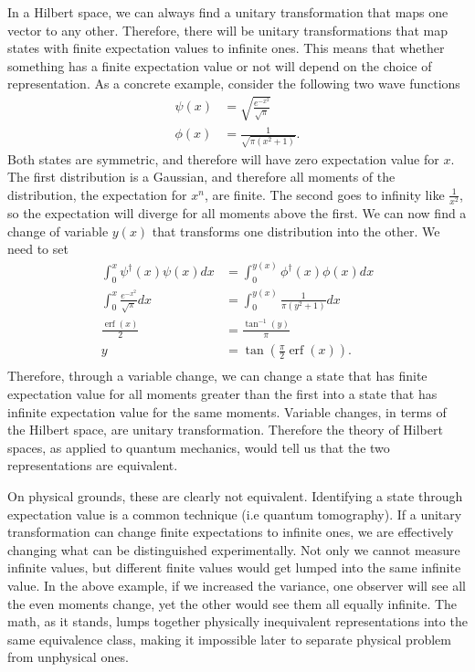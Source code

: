 \documentclass[10pt,twocolumn, nofootinbib]{revtex4-2}
\DeclareMathOperator{\erf}{erf}
\begin{document}
In a Hilbert space, we can always find a unitary transformation that maps one vector to any other. Therefore, there will be unitary transformations that map states with finite expectation values to infinite ones. This means that whether something has a finite expectation value or not will depend on the choice of representation. As a concrete example, consider the following two wave functions
\begin{align}
	\psi(x) &= \sqrt{\frac{e^{-x^2}}{\sqrt{\pi}}} \\
	\phi(x) &= \frac{1}{\sqrt{\pi(x^2 + 1)}}.
\end{align}
Both states are symmetric, and therefore will have zero expectation value for $x$. The first distribution is a Gaussian, and therefore all moments of the distribution, the expectation for $x^n$, are finite. The second goes to infinity like $\frac{1}{x^2}$, so the expectation will diverge for all moments above the first. We can now find a change of variable $y(x)$ that transforms one distribution into the other. We need to set
\begin{equation}
	\begin{aligned}
	\int_{0}^{x} \psi^\dagger(x) \psi(x) dx &= \int_{0}^{y(x)} \phi^\dagger(x) \phi(x) dx \\
	\int_{0}^{x} \frac{e^{-x^2}}{\sqrt{\pi}} dx &= \int_{0}^{y(x)} \frac{1}{\pi(y^2 + 1)} dx \\
	\frac{\erf(x)}{2} &= \frac{\tan^{-1}(y)}{\pi} \\
	y &= \tan \left(\frac{\pi}{2}\erf(x)\right). \\
	\end{aligned}
\end{equation}
Therefore, through a variable change, we can change a state that has finite expectation value for all moments greater than the first into a state that has infinite expectation value for the same moments. Variable changes, in terms of the Hilbert space, are unitary transformation. Therefore the theory of Hilbert spaces, as applied to quantum mechanics, would tell us that the two representations are equivalent.

On physical grounds, these are clearly not equivalent. Identifying a state through expectation value is a common technique (i.e quantum tomography). If a unitary transformation can change finite expectations to infinite ones, we are effectively changing what can be distinguished experimentally. Not only we cannot measure infinite values, but different finite values would get lumped into the same infinite value. In the above example, if we increased the variance, one observer will see all the even moments change, yet the other would see them all equally infinite. The math, as it stands, lumps together physically inequivalent representations into the same equivalence class, making it impossible later to separate physical problem from unphysical ones. 
\end{document}
